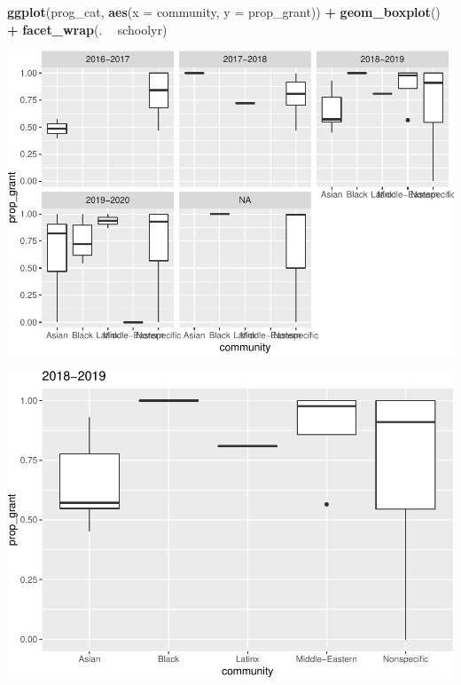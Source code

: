 \documentclass[]{article}
\newenvironment{Shaded}{\begin{snugshade}}{\end{snugshade}}
\newcommand{\DataTypeTok}[1]{\textcolor[rgb]{0.13,0.29,0.53}{#1}}
\newcommand{\KeywordTok}[1]{\textcolor[rgb]{0.13,0.29,0.53}{\textbf{#1}}}
\newcommand{\NormalTok}[1]{#1}
\newcommand{\OperatorTok}[1]{\textcolor[rgb]{0.81,0.36,0.00}{\textbf{#1}}}
\newcommand{\StringTok}[1]{\textcolor[rgb]{0.31,0.60,0.02}{#1}}
\begin{document}
\begin{Shaded}
\begin{Highlighting}[]
\KeywordTok{ggplot}\NormalTok{(prog_cat, }\KeywordTok{aes}\NormalTok{(}\DataTypeTok{x =}\NormalTok{ community, }\DataTypeTok{y =}\NormalTok{ prop_grant)) }\OperatorTok{+}
\StringTok{  }\KeywordTok{geom_boxplot}\NormalTok{() }\OperatorTok{+}
\StringTok{  }\KeywordTok{facet_wrap}\NormalTok{(. }\OperatorTok{~}\StringTok{ }\NormalTok{schoolyr)}
\end{Highlighting}
\end{Shaded}

\includegraphics{sofc-funding_files/figure-latex/unnamed-chunk-6-3.pdf}

\begin{Shaded}
\end{Shaded}

\includegraphics{sofc-funding_files/figure-latex/unnamed-chunk-6-4.pdf}
\end{document}
